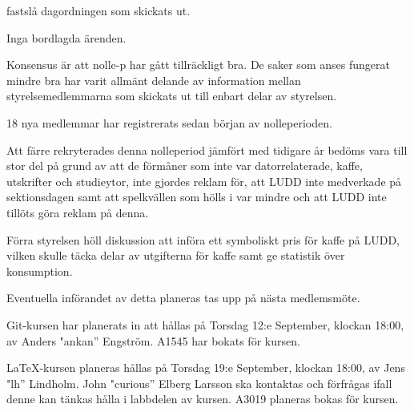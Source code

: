 \documentclass{protokoll}
\begin{document}
\newpage  


\begin{beslut}
     \att fastslå dagordningen som skickats ut.
\end{beslut}

Inga bordlagda ärenden.

Konsensus är att nolle-p har gått tillräckligt bra. De saker som anses fungerat
mindre bra har varit allmänt delande av information mellan styrelsemedlemmarna 
som skickats ut till enbart delar av styrelsen. 


18 nya medlemmar har registrerats sedan början av nolleperioden. 


Att färre rekryterades denna nolleperiod jämfört med tidigare år bedöms vara
till stor del på grund av att de förmåner som inte var datorrelaterade, kaffe,
utskrifter och studieytor, inte gjordes reklam för, att LUDD inte medverkade på
sektionsdagen samt att spelkvällen som hölls i var mindre och att LUDD inte 
tillöts göra reklam på denna. 



Förra styrelsen höll diskussion att införa ett symboliskt pris för kaffe på 
LUDD, vilken skulle täcka delar av utgifterna för kaffe samt ge statistik över
konsumption.


Eventuella införandet av detta planeras tas upp på nästa medlemsmöte. 

Git-kursen har planerats in att hållas på Torsdag 12:e September, klockan 
18:00, av Anders "ankan'' Engström. A1545 har bokats för kursen. 


LaTeX-kursen planeras hållas på Torsdag 19:e September, klockan 18:00, av Jens
"lh'' Lindholm. John "curious'' Elberg Larsson ska kontaktas och förfrågas
ifall denne kan tänkas hålla i labbdelen av kursen. A3019 planeras bokas för
kursen. 
\end{document}
